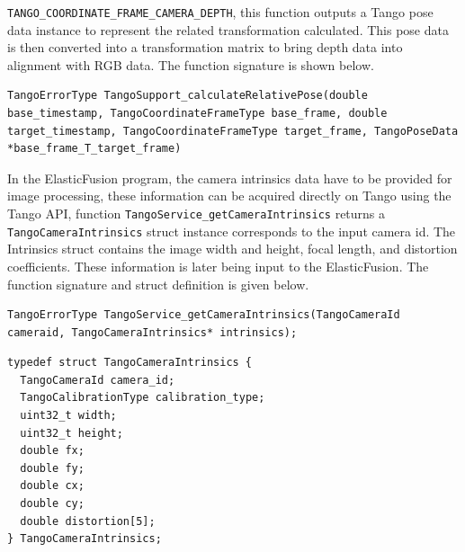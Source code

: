 \documentclass[12pt,twoside]{article}
\begin{document}
\verb|TANGO_COORDINATE_FRAME_CAMERA_DEPTH|, this function outputs a Tango pose data instance to represent the related transformation calculated. This pose data is then converted into a transformation matrix to bring depth data into alignment with RGB data. The function signature is shown below.\\
\begin{lstlisting}
TangoErrorType TangoSupport_calculateRelativePose(double base_timestamp, TangoCoordinateFrameType base_frame, double target_timestamp, TangoCoordinateFrameType target_frame, TangoPoseData *base_frame_T_target_frame)
\end{lstlisting}
In the ElasticFusion program, the camera intrinsics data have to be provided for image processing, these information can be acquired directly on Tango using the Tango API, function \verb|TangoService_getCameraIntrinsics| returns a \verb|TangoCameraIntrinsics| struct instance corresponds to the input camera id. The Intrinsics struct contains the image width and height, focal length, and distortion coefficients. These information is later being input to the ElasticFusion. The function signature and struct definition is given below.\\
\begin{lstlisting}
TangoErrorType TangoService_getCameraIntrinsics(TangoCameraId cameraid, TangoCameraIntrinsics* intrinsics);
\end{lstlisting}
\begin{lstlisting}
typedef struct TangoCameraIntrinsics {
  TangoCameraId camera_id;
  TangoCalibrationType calibration_type;
  uint32_t width;
  uint32_t height;
  double fx;
  double fy;
  double cx;
  double cy;
  double distortion[5];
} TangoCameraIntrinsics;
\end{lstlisting}

\newpage
\end{document}
